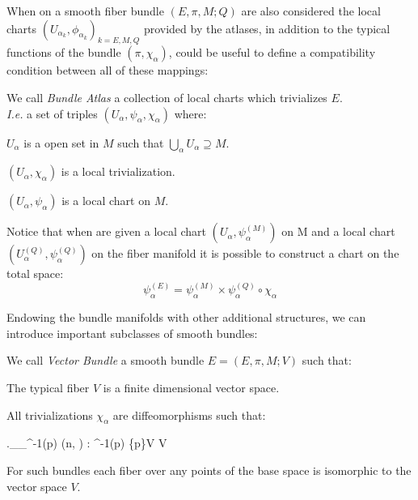 \documentclass[Main]{subfiles}
\begin{document}
			When on a smooth fiber bundle $(E,\pi,M;Q)$ are also considered the local charts $(U_{\alpha_k}, \phi_{\alpha_k})_{k = E,M,Q}$ provided by the atlases, in addition to the typical functions of the bundle $(\pi, \chi_{\alpha})$,  could be useful to define a compatibility condition between all of these mappings:
			\begin{definition}
				We call \emph{Bundle Atlas} a collection of local charts which trivializes $E$.\\
				\textit{I.e.} a set of triples  $(U_\alpha, \psi_\alpha, \chi_\alpha)$ where:
				\begin{compactitemize}
					\item $U_\alpha$ is a open set in $M$ such that $\bigcup_{\alpha} U_{\alpha} \supseteq M$.
					\item $(U_\alpha,\chi_\alpha)$  is a local trivialization.
					\item $(U_\alpha,\psi_\alpha)$ is a local chart on $M$.
				\end{compactitemize}		
			\end{definition}

			Notice that when are given a local chart $(U_\alpha, \psi_\alpha^{(M)} )$ on M and a local chart $(U_\alpha^{(Q)}, \psi_\alpha^{(Q)})$ on the fiber manifold it is possible to construct a chart on the total space:	
				\begin{displaymath}
							\psi^{(E)}_\alpha = \psi_\alpha^{(M)} \times  \psi_\alpha^{(Q)} \circ \chi_\alpha
				\end{displaymath}	
			\vspace{3mm}			
			
			Endowing the bundle manifolds with other additional structures, we can introduce important subclasses of smooth bundles:
			\begin{definition}
				We call \emph{Vector Bundle} a smooth bundle $E=(E,\pi,M;V)$ such that:
				\begin{compactitemize}
					\item The typical fiber $V$ is a finite dimensional vector space.	
					\item All trivializations $\chi_{\alpha} $ are diffeomorphisms such that:
						\begin{compactdisplaymath}
							\left.\chi_{\alpha}\right\vert_{\pi^{-1}(p)} \in {}(n, )
							\quad : \; \pi^{-1}(p) \rightarrow \{p\}\times V \simeq V
						\end{compactdisplaymath}
				\end{compactitemize}
			\end{definition}
			For such bundles each fiber over any points of the base space is isomorphic to the vector space $V$.
\end{document}
